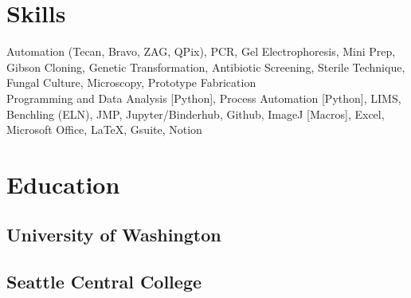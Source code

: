 \documentclass[]{forrest-resume-interfont}
\begin{document}
\spacesep


\linesep

\section{ Skills}
Automation (Tecan, Bravo, ZAG, QPix),
PCR, 
Gel Electrophoresis, 
Mini Prep, 
Gibson Cloning,
Genetic Transformation,
Antibiotic Screening,
Sterile Technique, 
Fungal Culture, 
Microscopy, 
Prototype Fabrication
\\

Programming and Data Analysis [Python],
Process Automation [Python],
LIMS,
Benchling (ELN),
JMP,
Jupyter/Binderhub,
Github,
ImageJ [Macros],
Excel,
Microsoft Office,
LaTeX,
Gsuite,
Notion

\linesep


\section{ Education}
\subsection{University of Washington}
\spacesep
\subsection{Seattle Central College}

\vfill

\noindent\makebox[\linewidth]{\color{black}\rule{\paperwidth}{0.4pt}}
\end{document}
